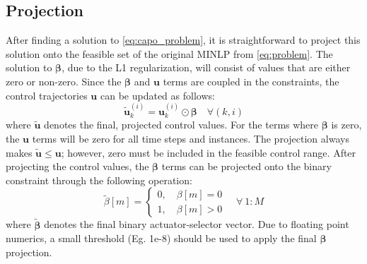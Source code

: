 \subsection{Projection}
After finding a solution to \eqref{eq:capo_problem}, it is straightforward to project this solution onto the feasible set of the original MINLP from \eqref{eq:problem}. The solution to $\boldsymbol{\beta}$, due to the L1 regularization, will consist of values that are either zero or non-zero. Since the $\boldsymbol{\beta}$ and $\textbf{u}$ terms are coupled in the constraints, the control trajectories $\textbf{u}$ can be updated as follows:
\begin{equation}
      \tilde{\textbf{u}}^{(i)}_k = \textbf{u}^{(i)}_k \odot \boldsymbol{\beta} \quad \forall (k,i) 
\end{equation}
where $\tilde{\textbf{u}}$ denotes the final, projected control values. For the terms where $\boldsymbol{\beta}$ is zero, the $\textbf{u}$ terms will be zero for all time steps and instances. The projection always makes $\tilde{\textbf{u}} \leq \textbf{u}$; however, zero must be included in the feasible control range. After projecting the control values, the $\boldsymbol{\beta}$ terms can be projected onto the binary constraint through the following operation: 
\begin{equation}
 \tilde{\beta}[m] = \begin{cases}
0 ,\quad {\beta[m] = 0} \\
1 ,\quad {\beta[m] > 0}
 \end{cases} \quad \forall \ 1:M
\end{equation}
where $\boldsymbol{\tilde\beta}$ denotes the final binary actuator-selector vector. Due to floating point numerics, a small threshold (Eg. 1e-8) should be used to apply the final $\boldsymbol{\beta}$ projection. 

